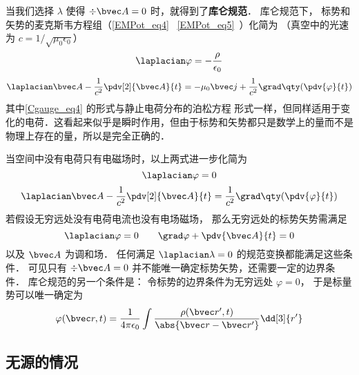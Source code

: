 
\begin{issues}
\issueDraft
\end{issues}


当我们选择 $\lambda$ 使得 $\div \bvec A = 0$ 时，就得到了\textbf{库仑规范}． 库仑规范下， 标势和矢势的麦克斯韦方程组（\autoref{EMPot_eq4}~ \autoref{EMPot_eq5}~）化简为 （真空中的光速为 $c = 1/\sqrt{\mu_0\epsilon_0}$）%
\begin{equation}\label{Cgauge_eq4}
\laplacian \varphi = -\frac{\rho}{\epsilon_0}
\end{equation}
\begin{equation}
\laplacian \bvec A - \frac{1}{c^2} \pdv[2]{\bvec A}{t} = -\mu_0\bvec j + \frac{1}{c^2} \grad\qty(\pdv{\varphi}{t})
\end{equation}
其中\autoref{Cgauge_eq4} 的形式与静止电荷分布的泊松方程%
形式一样，但同样适用于变化的电荷．这看起来似乎是瞬时作用，但由于标势和矢势都只是数学上的量而不是物理上存在的量，所以是完全正确的．

当空间中没有电荷只有电磁场时，以上两式进一步化简为
\begin{equation}
\laplacian \varphi = 0
\end{equation}
\begin{equation}
\laplacian \bvec A - \frac{1}{c^2}\pdv[2]{\bvec A}{t} = \frac{1}{c^2} \grad\qty(\pdv{\varphi}{t})
\end{equation}
若假设无穷远处没有电荷电流也没有电场磁场， 那么无穷远处的标势矢势需满足
\begin{equation}
\laplacian \varphi = 0 \qquad
\grad \varphi + \pdv{\bvec A}{t} = 0
\end{equation}
以及 $\bvec A$ 为调和场． 任何满足 $\laplacian \lambda = 0$ 的规范变换都能满足这些条件． 可见只有 $\div \bvec A = 0$ 并不能唯一确定标势矢势，还需要一定的边界条件． 库仑规范的另一个条件是： 令标势的边界条件为无穷远处 $\varphi = 0$， 于是标量势可以唯一确定为
\begin{equation}\label{Cgauge_eq1}
\varphi(\bvec r, t) = \frac{1}{4\pi\epsilon_0} \int \frac{\rho(\bvec r', t)}{\abs{\bvec r - \bvec r'}} \dd[3]{r'}
\end{equation}

\subsection{无源的情况}

